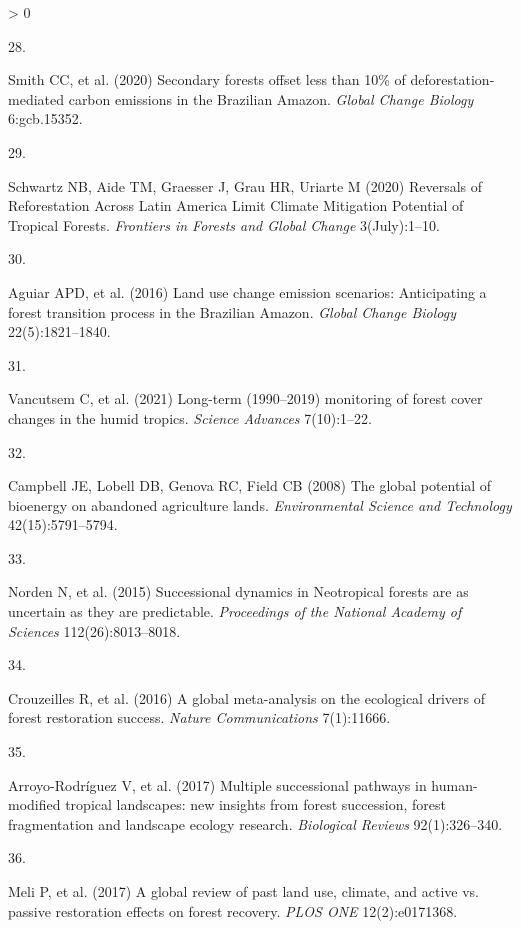 \documentclass[9pt,twocolumn,twoside,lineno]{pnas-new}
\newlength{\csllabelwidth}
\newlength{\cslhangindent}
\newenvironment{CSLReferences}[2] %
 {%
  \setlength{\parindent}{0pt}
  \ifodd #1 \everypar{\setlength{\hangindent}{\cslhangindent}}\ignorespaces\fi
  \ifnum #2 > 0
  \setlength{\parskip}{#2\baselineskip}
  \fi
 }%
 {}
\newcommand{\CSLLeftMargin}[1]{\parbox[t]{\csllabelwidth}{#1}}
\newcommand{\CSLRightInline}[1]{\parbox[t]{\linewidth - \csllabelwidth}{#1}\break}
\begin{document}
\begin{CSLReferences}{0}{0}
\leavevmode\hypertarget{ref-Smith2020}{}%
\CSLLeftMargin{28. }
\CSLRightInline{Smith CC, et al. (2020) {Secondary forests offset less than 10{\%} of deforestation‐mediated carbon emissions in the Brazilian Amazon}. \emph{Global Change Biology} 6:gcb.15352.}

\leavevmode\hypertarget{ref-Schwartz2020}{}%
\CSLLeftMargin{29. }
\CSLRightInline{Schwartz NB, Aide TM, Graesser J, Grau HR, Uriarte M (2020) {Reversals of Reforestation Across Latin America Limit Climate Mitigation Potential of Tropical Forests}. \emph{Frontiers in Forests and Global Change} 3(July):1--10.}

\leavevmode\hypertarget{ref-Aguiar2016}{}%
\CSLLeftMargin{30. }
\CSLRightInline{Aguiar APD, et al. (2016) {Land use change emission scenarios: Anticipating a forest transition process in the Brazilian Amazon}. \emph{Global Change Biology} 22(5):1821--1840.}

\leavevmode\hypertarget{ref-Vancutsem2021}{}%
\CSLLeftMargin{31. }
\CSLRightInline{Vancutsem C, et al. (2021) {Long-term (1990--2019) monitoring of forest cover changes in the humid tropics}. \emph{Science Advances} 7(10):1--22.}

\leavevmode\hypertarget{ref-Campbell2008}{}%
\CSLLeftMargin{32. }
\CSLRightInline{Campbell JE, Lobell DB, Genova RC, Field CB (2008) {The global potential of bioenergy on abandoned agriculture lands}. \emph{Environmental Science and Technology} 42(15):5791--5794.}

\leavevmode\hypertarget{ref-Norden2015}{}%
\CSLLeftMargin{33. }
\CSLRightInline{Norden N, et al. (2015) {Successional dynamics in Neotropical forests are as uncertain as they are predictable}. \emph{Proceedings of the National Academy of Sciences} 112(26):8013--8018.}

\leavevmode\hypertarget{ref-Crouzeilles2016}{}%
\CSLLeftMargin{34. }
\CSLRightInline{Crouzeilles R, et al. (2016) {A global meta-analysis on the ecological drivers of forest restoration success}. \emph{Nature Communications} 7(1):11666.}

\leavevmode\hypertarget{ref-Arroyo-Rodriguez2017}{}%
\CSLLeftMargin{35. }
\CSLRightInline{Arroyo-Rodríguez V, et al. (2017) {Multiple successional pathways in human-modified tropical landscapes: new insights from forest succession, forest fragmentation and landscape ecology research}. \emph{Biological Reviews} 92(1):326--340.}

\leavevmode\hypertarget{ref-Meli2017}{}%
\CSLLeftMargin{36. }
\CSLRightInline{Meli P, et al. (2017) {A global review of past land use, climate, and active vs. passive restoration effects on forest recovery}. \emph{PLOS ONE} 12(2):e0171368.}


\end{CSLReferences}
\end{document}
